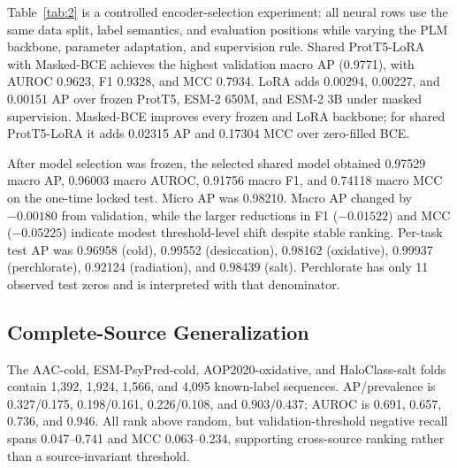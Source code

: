 \documentclass[conference]{IEEEtran}
\begin{document}
Table~\ref{tab:2} is a controlled encoder-selection experiment: all neural rows use the same data split, label semantics, and evaluation positions while varying the PLM backbone, parameter adaptation, and supervision rule. Shared ProtT5-LoRA with Masked-BCE achieves the highest validation macro AP (0.9771), with AUROC 0.9623, F1 0.9328, and MCC 0.7934. LoRA adds 0.00294, 0.00227, and 0.00151 AP over frozen ProtT5, ESM-2 650M, and ESM-2 3B under masked supervision. Masked-BCE improves every frozen and LoRA backbone; for shared ProtT5-LoRA it adds 0.02315 AP and 0.17304 MCC over zero-filled BCE.

After model selection was frozen, the selected shared model obtained 0.97529 macro AP, 0.96003 macro AUROC, 0.91756 macro F1, and 0.74118 macro MCC on the one-time locked test. Micro AP was 0.98210. Macro AP changed by $-0.00180$ from validation, while the larger reductions in F1 ($-0.01522$) and MCC ($-0.05225$) indicate modest threshold-level shift despite stable ranking. Per-task test AP was 0.96958 (cold), 0.99552 (desiccation), 0.98162 (oxidative), 0.99937 (perchlorate), 0.92124 (radiation), and 0.98439 (salt). Perchlorate has only 11 observed test zeros and is interpreted with that denominator.

\subsection{Complete-Source Generalization}
The AAC-cold, ESM-PsyPred-cold, AOP2020-oxidative, and HaloClass-salt folds contain 1,392, 1,924, 1,566, and 4,095 known-label sequences. AP/prevalence is 0.327/0.175, 0.198/0.161, 0.226/0.108, and 0.903/0.437; AUROC is 0.691, 0.657, 0.736, and 0.946. All rank above random, but validation-threshold negative recall spans 0.047--0.741 and MCC 0.063--0.234, supporting cross-source ranking rather than a source-invariant threshold.
\end{document}

